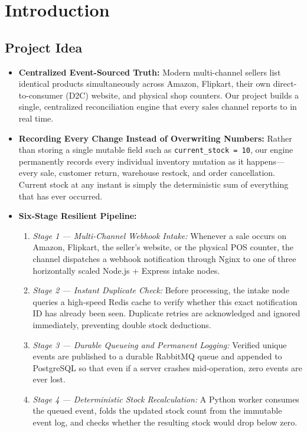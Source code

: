 \documentclass[oneside,a4paper,12pt]{report}
\begin{document}
\chapter{Introduction}

\section{Project Idea}
\begin{itemize}
  \item \textbf{Centralized Event-Sourced Truth:} Modern multi-channel sellers list identical products simultaneously across Amazon, Flipkart, their own direct-to-consumer (D2C) website, and physical shop counters. Our project builds a single, centralized reconciliation engine that every sales channel reports to in real time.
  \item \textbf{Recording Every Change Instead of Overwriting Numbers:} Rather than storing a single mutable field such as \texttt{current\_stock = 10}, our engine permanently records every individual inventory mutation as it happens—every sale, customer return, warehouse restock, and order cancellation. Current stock at any instant is simply the deterministic sum of everything that has ever occurred.
  \item \textbf{Six-Stage Resilient Pipeline:}
  \begin{enumerate}
    \item \textit{Stage 1 — Multi-Channel Webhook Intake:} Whenever a sale occurs on Amazon, Flipkart, the seller's website, or the physical POS counter, the channel dispatches a webhook notification through Nginx to one of three horizontally scaled Node.js + Express intake nodes.
    \item \textit{Stage 2 — Instant Duplicate Check:} Before processing, the intake node queries a high-speed Redis cache to verify whether this exact notification ID has already been seen. Duplicate retries are acknowledged and ignored immediately, preventing double stock deductions.
    \item \textit{Stage 3 — Durable Queueing and Permanent Logging:} Verified unique events are published to a durable RabbitMQ queue and appended to PostgreSQL so that even if a server crashes mid-operation, zero events are ever lost.
    \item \textit{Stage 4 — Deterministic Stock Recalculation:} A Python worker consumes the queued event, folds the updated stock count from the immutable event log, and checks whether the resulting stock would drop below zero.

\end{enumerate}
\end{itemize}
\end{document}
